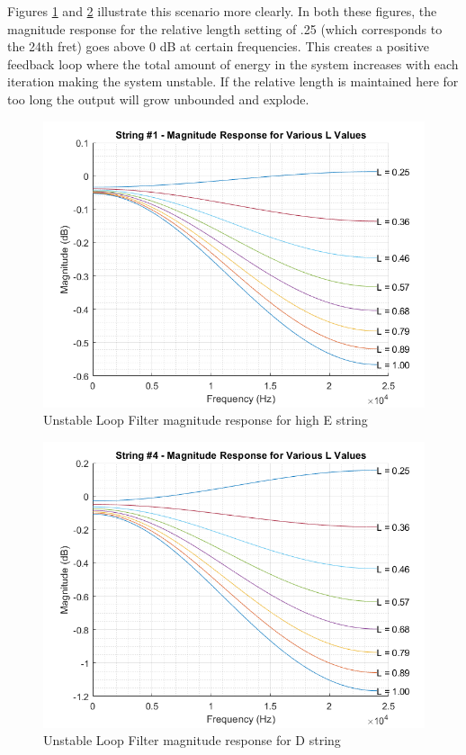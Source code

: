 \documentclass[../main.tex]{subfiles}
\begin{document}
Figures \ref{fig:Str1LoopMag} and \ref{fig:Str4LoopMag} illustrate this scenario more clearly. In both these figures, the magnitude response for the relative length setting of .25 (which corresponds to the 24th fret) goes above 0 dB at certain frequencies. This creates a positive feedback loop where the total amount of energy in the system increases with each iteration making the system unstable. If the relative length is maintained here for too long the output will grow unbounded and explode.

\begin{figure}[h]
    \centering
    \includegraphics[scale=.65]{./images/plots/String 1 - Loop Filter Magnitude Response.png}
    \caption{Unstable Loop Filter magnitude response for high E string}
    \label{fig:Str1LoopMag}
\end{figure}

\begin{figure}[h]
    \centering
    \includegraphics[scale=.65]{./images/plots/String 4 - Loop Filter Magnitude Response.png}
    \caption{Unstable Loop Filter magnitude response for D string}
    \label{fig:Str4LoopMag}
\end{figure}
\end{document}
